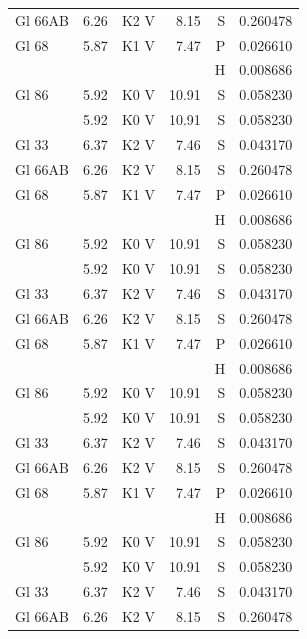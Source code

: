 \documentclass{aa}
\begin{document}
\begin{appendix}
\begin{longtable}{lllrrr}
		Gl 66AB   & 6.26    & K2 V     & 8.15     & S    & 0.260478   \\
		Gl 68     & 5.87    & K1 V     & 7.47     & P    & 0.026610   \\
		          &         &          &          & H    & 0.008686   \\
		Gl 86     & 5.92    & K0 V     & 10.91    & S    & 0.058230   \\            & 5.92 & K0 V & 10.91& S & 0.058230\\
		Gl 33     & 6.37    & K2 V     & 7.46     & S    & 0.043170   \\
		Gl 66AB   & 6.26    & K2 V     & 8.15     & S    & 0.260478   \\
		Gl 68     & 5.87    & K1 V     & 7.47     & P    & 0.026610   \\
		          &         &          &          & H    & 0.008686   \\
		Gl 86     & 5.92    & K0 V     & 10.91    & S    & 0.058230   \\            & 5.92 & K0 V & 10.91& S & 0.058230\\
		Gl 33     & 6.37    & K2 V     & 7.46     & S    & 0.043170   \\
		Gl 66AB   & 6.26    & K2 V     & 8.15     & S    & 0.260478   \\
		Gl 68     & 5.87    & K1 V     & 7.47     & P    & 0.026610   \\
		          &         &          &          & H    & 0.008686   \\
		Gl 86     & 5.92    & K0 V     & 10.91    & S    & 0.058230   \\            & 5.92 & K0 V & 10.91& S & 0.058230\\
		Gl 33     & 6.37    & K2 V     & 7.46     & S    & 0.043170   \\
		Gl 66AB   & 6.26    & K2 V     & 8.15     & S    & 0.260478   \\
		Gl 68     & 5.87    & K1 V     & 7.47     & P    & 0.026610   \\
		          &         &          &          & H    & 0.008686   \\
		Gl 86     & 5.92    & K0 V     & 10.91    & S    & 0.058230   \\
		          & 5.92    & K0 V     & 10.91    & S    & 0.058230   \\
		Gl 33     & 6.37    & K2 V     & 7.46     & S    & 0.043170   \\
		Gl 66AB   & 6.26    & K2 V     & 8.15     & S    & 0.260478   \\

\end{longtable}
\end{appendix}
\end{document}
